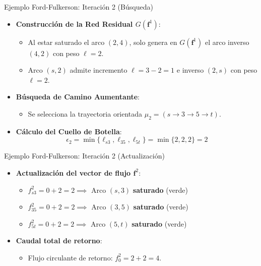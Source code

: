 \documentclass[
  ignorenonframetext,
]{beamer}
\providecommand{\tightlist}{%
  \setlength{\itemsep}{0pt}\setlength{\parskip}{0pt}}
\begin{document}
\begin{frame}{Ejemplo Ford-Fulkerson: Iteración 2 (Búsqueda)}
\label{ejemplo-ford-fulkerson-iteraciuxf3n-2-buxfasqueda}
\begin{itemize}
\tightlist
\item
  \textbf{Construcción de la Red Residual \(G(\mathbf{f}^1)\)}:

  \begin{itemize}
  \tightlist
  \item
    Al estar saturado el arco \((2,4)\), solo genera en
    \(G(\mathbf{f}^1)\) el arco inverso \((4,2)\) con peso \(\ell = 2\).
  \item
    Arco \((s,2)\) admite incremento \(\ell = 3 - 2 = 1\) e inverso
    \((2,s)\) con peso \(\ell = 2\).
  \end{itemize}
\item
  \textbf{Búsqueda de Camino Aumentante}:

  \begin{itemize}
  \tightlist
  \item
    Se selecciona la trayectoria orientada
    \(\mu_2 = (s \to 3 \to 5 \to t)\).
  \end{itemize}
\item
  \textbf{Cálculo del Cuello de Botella}:
  \[\epsilon_2 = \min \{\ell_{s3}, \ell_{35}, \ell_{5t}\} = \min \{2, 2, 2\} = 2\]
\end{itemize}
\end{frame}

\begin{frame}{Ejemplo Ford-Fulkerson: Iteración 2 (Actualización)}
\label{ejemplo-ford-fulkerson-iteraciuxf3n-2-actualizaciuxf3n}
\begin{itemize}
\tightlist
\item
  \textbf{Actualización del vector de flujo \(\mathbf{f}^2\)}:

  \begin{itemize}
  \tightlist
  \item
    \(f_{s3}^2 = 0 + 2 = 2 \implies\) Arco \((s,3)\) \textbf{saturado}
    (verde)
  \item
    \(f_{35}^2 = 0 + 2 = 2 \implies\) Arco \((3,5)\) \textbf{saturado}
    (verde)
  \item
    \(f_{5t}^2 = 0 + 2 = 2 \implies\) Arco \((5,t)\) \textbf{saturado}
    (verde)
  \end{itemize}
\item
  \textbf{Caudal total de retorno}:

  \begin{itemize}
  \tightlist
  \item
    Flujo circulante de retorno: \(f_0^2 = 2 + 2 = 4\).
  \end{itemize}
\end{itemize}
\end{frame}
\end{document}
